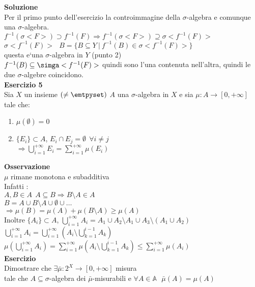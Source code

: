 \documentclass[12px]{article}
\begin{document}
	\textbf{Soluzione}\\
	Per il primo punto dell'esercizio la controimmagine della $\sigma$-algebra e comunque una $\sigma$-algebra.\\
	$f^{-1}(\sigma<F>)\supset f^{-1}(F) \Rightarrow f^{-1}(\sigma < F>)\supseteq \sigma < f^{-1}(F)>$\\
	$\sigma < f^{-1}(F)>\ \ \ B = \{B\subseteq Y \ | \ f^{-1}(B)\in\sigma <f^{-1}(F)>\}$\\
	questa e`una  $\sigma$-algebra in $Y$ (punto 2)\\
	$f^{-1}(B) \subseteq\simga <f^{-1}(F)>$ quindi sono l'una contenuta nell'altra, quindi le due  $\sigma$-algebre coincidono.\\[10px]
\textbf{Esercizio 5}\\
Sia $X$ un insieme $(\neq \emtpyset)$  $A$ una $\sigma$-algebra in $X$ e sia $\mu : A \rightarrow[0,+\infty]$ tale che:
\begin{enumerate}
	\item $\mu(\emptyset) = 0$
	\item $\{E_i\}\subset A$, $E_i\cap E_j = \emptyset \ \ \forall i\neq j$  \\
		$ \Rightarrow \bigcup^{+\infty}_{i = 1}E_i = \sum^{+\infty}_{i = 1}\mu(E_i)$
\end{enumerate}
\textbf{Osservazione}\\
$\mu$ rimane monotona e subadditiva\\
Infatti :\\
$A,B\in A \ \ A\subseteq B \Rightarrow  B\setminus A\in A$ \\
$B = A\cup B\setminus A \cup \emptyset \cup\ldots$\\
 $ \Rightarrow  \mu(B) = \mu(A) + \mu(B\setminus A)\geq \mu(A)$ \\
 Inoltre $\{A_i\}\subset A$,  $ \bigcup^{+\infty}_{i=1}A_i = A_1\cup A_2\setminus A_1\cup A_3\setminus (A_1\cup A_2)$ \\
$ \bigcup^{+\infty}_{i = 1}A_i = \bigcup^{+\infty}_{i = 1}(A_i\setminus  \bigcup^{i- 1}_{k = 1} A_k)$\\
$\mu( \bigcup^{+\infty}_{i = 1}A_i) = \sum^{+\infty}_{i = 1}\mu(A_i\setminus \bigcup^{i -1}_{k = 1}A_k )\leq \sum^{+\infty}_{i = 1}\mu(A_i)$\\
\textbf{Esercizio}\\
Dimostrare che $\exists \bar\mu : 2^X \rightarrow [0,+\infty]$ misura \\
tale che $A\subseteq \sigma$-algebra dei $\bar\mu$-misurabili e $\forall A\in \mathbb A\ \ \  \bar\mu(A) = \mu(A)$ \\
\end{document}
